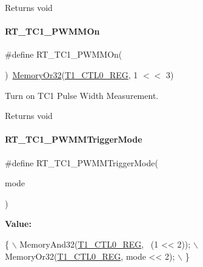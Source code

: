 \begin{DoxyReturn}{Returns}
void 
\end{DoxyReturn}
\mbox{\label{a00044_a6f11e47b5a8e7947fc76e9955e94acea}} 
\paragraph{\texorpdfstring{R\+T\+\_\+\+T\+C1\+\_\+\+P\+W\+M\+M\+On}{RT\_TC1\_PWMMOn}}
{\footnotesize\ttfamily \#define R\+T\+\_\+\+T\+C1\+\_\+\+P\+W\+M\+M\+On(\begin{DoxyParamCaption}{ }\end{DoxyParamCaption})~\mbox{\hyperlink{a00020_a27874a97deab7cecdde5ddecf466e31e}{Memory\+Or32}}(\mbox{\hyperlink{a00020_adadaa0ab1ebbd7ba9b70dfd24c3ed44da38632250c2e72df96fcaa3f8bd8ecc5e}{T1\+\_\+\+C\+T\+L0\+\_\+\+R\+EG}}, 1 $<$$<$ 3)}



Turn on T\+C1 Pulse Width Measurement. 

\begin{DoxyReturn}{Returns}
void 
\end{DoxyReturn}
\mbox{\label{a00044_a326645a1e9eb49468e696ba7a186cdba}} 
\paragraph{\texorpdfstring{R\+T\+\_\+\+T\+C1\+\_\+\+P\+W\+M\+M\+Trigger\+Mode}{RT\_TC1\_PWMMTriggerMode}}
{\footnotesize\ttfamily \#define R\+T\+\_\+\+T\+C1\+\_\+\+P\+W\+M\+M\+Trigger\+Mode(\begin{DoxyParamCaption}\item[{}]{mode }\end{DoxyParamCaption})}

{\bfseries Value\+:}
\begin{DoxyCode}
\{                                        \(\backslash\)
        MemoryAnd32(\mbox{\hyperlink{a00020_adadaa0ab1ebbd7ba9b70dfd24c3ed44da38632250c2e72df96fcaa3f8bd8ecc5e}{T1\_CTL0\_REG}}, ~(1 << 2)); \(\backslash\)
        MemoryOr32(\mbox{\hyperlink{a00020_adadaa0ab1ebbd7ba9b70dfd24c3ed44da38632250c2e72df96fcaa3f8bd8ecc5e}{T1\_CTL0\_REG}}, mode << 2);  \(\backslash\)
    \}
\end{DoxyCode}


